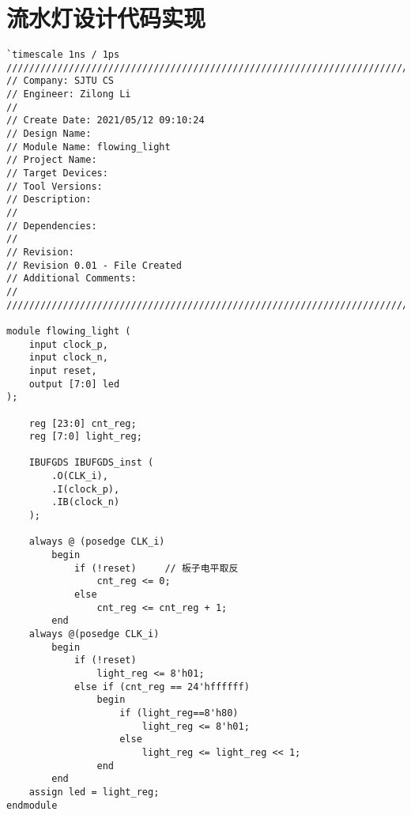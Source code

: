 \documentclass[a4paper,UTF8]{ctexart}
\begin{document}
\appendix
\section{流水灯设计代码实现}\label{app:design}
\begin{lstlisting}[caption={flowing_light.v}]
`timescale 1ns / 1ps
//////////////////////////////////////////////////////////////////////////////////
// Company: SJTU CS
// Engineer: Zilong Li
// 
// Create Date: 2021/05/12 09:10:24
// Design Name: 
// Module Name: flowing_light
// Project Name: 
// Target Devices: 
// Tool Versions: 
// Description: 
// 
// Dependencies: 
// 
// Revision:
// Revision 0.01 - File Created
// Additional Comments:
// 
//////////////////////////////////////////////////////////////////////////////////

module flowing_light (
    input clock_p,
    input clock_n,
    input reset,
    output [7:0] led
);

    reg [23:0] cnt_reg;
    reg [7:0] light_reg;

    IBUFGDS IBUFGDS_inst (
        .O(CLK_i),
        .I(clock_p),
        .IB(clock_n)
    );

    always @ (posedge CLK_i)
        begin
            if (!reset)     // 板子电平取反
                cnt_reg <= 0;
            else
                cnt_reg <= cnt_reg + 1;
        end
    always @(posedge CLK_i) 
        begin
            if (!reset) 
                light_reg <= 8'h01;
            else if (cnt_reg == 24'hffffff)
                begin
                    if (light_reg==8'h80)
                        light_reg <= 8'h01;
                    else
                        light_reg <= light_reg << 1;
                end
        end
    assign led = light_reg;
endmodule
\end{lstlisting}

\end{document}
